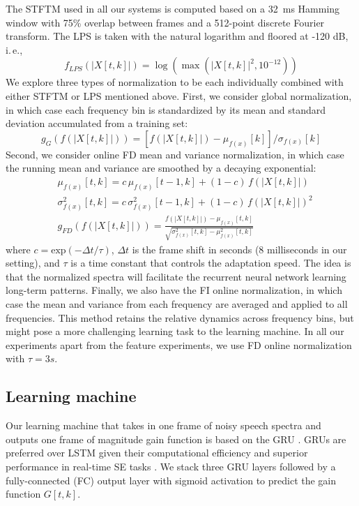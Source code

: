 \documentclass{article}
\begin{document}
The \ac{STFTM} used in all our systems is computed based on a 32~ms Hamming window with 75\% overlap between frames and a 512-point discrete Fourier transform. The \ac{LPS} is taken with the natural logarithm and floored at -120 dB, i.\,e.,
\begin{equation}
    f_{LPS}(|X[t,k]|) = \log(\max(|X[t,k]|^2, 10^{-12}))
\end{equation}
We explore three types of normalization to be each individually combined with either \ac{STFTM} or \ac{LPS} mentioned above. First, we consider global normalization, in which case each frequency bin is standardized by its mean and standard deviation accumulated from a training set:
\begin{equation}
    g_{G}(f(|X[t,k]|)) = \left[f(|X[t,k]|)-\mu_{f(x)}[k]\right] / \sigma_{f(x)}[k]
\end{equation}
Second, we consider online \ac{FD} mean and variance normalization, in which case the running mean and variance are smoothed by a decaying exponential:
\begin{align}
&\mu_{f(x)}[t,k] = c \, \mu_{f(x)}[t-1,k] + (1-c) \, f(|X[t,k]|)\\
&\sigma^2_{f(x)}[t,k] = c \, \sigma^2_{f(x)}[t-1,k] + (1-c) \, f(|X[t,k]|)^2\\
& g_{FD}(f(|X[t,k]|)) = \frac{f(|X[t,k]|)-\mu_{f(x)}[t,k]}{\sqrt{\sigma^2_{f(x)}[t,k]-\mu_{f(x)}^2[t,k]}}
\end{align}
where $c=\text{exp}(-\Delta t/\tau)$, $\Delta t$ is the frame shift in seconds (8 milliseconds in our setting), and $\tau$ is a time constant that controls the adaptation speed. The idea is that the normalized spectra will facilitate the recurrent neural network learning long-term patterns. Finally, we also have the \ac{FI} online normalization, in which case the mean and variance from each frequency are averaged and applied to all frequencies. This method retains the relative dynamics across frequency bins, but might pose a more challenging learning task to the learning machine. In all our experiments apart from the feature experiments, we use \ac{FD} online normalization with $\tau=3s$.
\subsection{Learning machine}
Our learning machine that takes in one frame of noisy speech spectra and outputs one frame of magnitude gain function is based on the \ac{GRU} \cite{cho2014learning}. \ac{GRU}s are preferred over \ac{LSTM}\cite{hochreiter1997long} given their computational efficiency and superior performance in real-time SE tasks \cite{Reddy2019}. We stack three GRU layers followed by a fully-connected (FC) output layer with sigmoid activation to predict the gain function $G[t,k]$.
\end{document}

